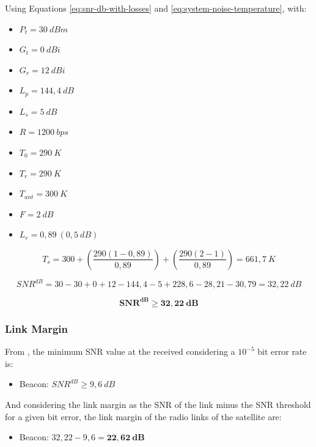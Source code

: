 Using Equations \ref{eq:snr-db-with-losses} and \ref{eq:system-noise-temperature}, with:

\begin{itemize}
    \item $P_{t} = 30\ dBm$
    \item $G_{t} = 0\ dBi$
    \item $G_{r} = 12\ dBi$
    \item $L_{p} = 144,4\ dB$
    \item $L_{s} = 5\ dB$
    \item $R = 1200\ bps$
    \item $T_{0} = 290\ K$
    \item $T_{r} = 290\ K$
    \item $T_{ant} = 300\ K$
    \item $F = 2\ dB$
    \item $L_{r} = 0,89\ (0,5\ dB)$
\end{itemize}

\begin{equation}
    T_{s} = 300 + \left( \frac{290 (1 - 0,89)}{0,89} \right) + \left( \frac{290 (2 - 1)}{0,89} \right) = 661,7\ K
\end{equation}

\begin{equation}
    SNR^{dB} = 30 - 30 + 0 + 12 - 144,4 - 5 + 228,6 - 28,21 - 30,79 = 32,22\ dB
\end{equation}

\begin{equation}
\mathbf{SNR^{dB} \geq 32,22\ dB}
\end{equation}

\subsubsection{Link Margin}

From \cite{larson2005}, the minimum SNR value at the received considering a $10^{-5}$ bit error rate is:

\begin{itemize}
    \item Beacon: $SNR^{dB} \geq 9,6\ dB$
\end{itemize}

And considering the link margin as the SNR of the link minus the SNR threshold for a given bit error, the link margin of the radio links of the satellite are:

\begin{itemize}
    \item Beacon: $32,22 - 9,6 = \mathbf{22,62\ dB}$
\end{itemize}

